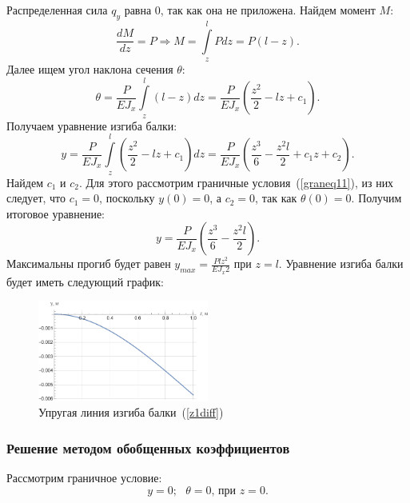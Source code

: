 \documentclass[12pt, a4paper]{article}
\begin{document}
Распределенная сила $q_{y}$ равна  0, так как она не приложена. Найдем момент $M$:
\begin{equation}
	\label{z111}
	\frac{d M}{d z} = P \Rightarrow M = \int\limits_z^l P d z = P(l - z).
\end{equation} 
Далее ищем угол наклона сечения $\theta$:
 \begin{equation}
 	\label{z112}
 	\theta = \frac{P}{E J_{x}} \int\limits_z^l (l - z)d z = \frac{P}{E J_{x}} (\frac{z^2}{2} - l z + c_1).
 \end{equation} 
Получаем уравнение изгиба балки: 
 \begin{equation}
	\label{z112}
	y = \frac{P}{E J_{x}} \int\limits_z^l (\frac{z^2}{2} - l z + c_1) d z = \frac{P}{E J_{x}} (\frac{z^3}{6} - \frac{z^2 l}{2} + c_1 z + c_2).
\end{equation}
Найдем $c_1$ и $c_2$. Для этого рассмотрим граничные условия~(\ref{graneq11}), из них следует, что $c_1 = 0$, поскольку $y(0) = 0$, а $c_2 = 0$, так как $\theta(0) = 0$. Получим итоговое уравнение: 
\begin{equation}
	\label{z1diff}
	y = \frac{P}{E J_{x}} (\frac{z^3}{6} - \frac{z^2 l}{2}).
\end{equation}
Максимальны прогиб будет равен $y_{max} = \frac{P l z^2}{E J_{x} 2}$ при $z = l$. Уравнение изгиба балки будет иметь следующий график:
\begin{figure}[!h]
	\centering
	\includegraphics[width=0.5\textwidth]{g.1}%
	\caption{Упругая линия изгиба балки~(\ref{z1diff})}
	\vspace*{-2mm}
	\label{g1}
\end{figure}

\subsubsection{Решение методом обобщенных коэффициентов}
Рассмотрим граничное условие:
\begin{equation}
	\label{graneq11}
	y = 0;\mbox{ } \theta = 0\mbox{, при } z = 0.
\end{equation}
\end{document}
